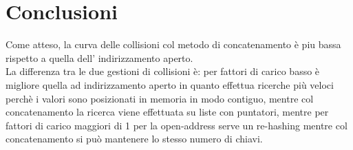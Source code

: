 \documentclass{article}
\begin{document}
\section{Conclusioni}
Come atteso, la curva delle collisioni col metodo di concatenamento è piu bassa rispetto a quella dell' indirizzamento aperto.\\ La differenza tra le due gestioni di collisioni è: per fattori di carico basso è migliore quella ad indirizzamento aperto in quanto effettua ricerche più veloci perchè i valori sono posizionati in memoria in modo contiguo, mentre col concatenamento la ricerca viene effettuata su liste con puntatori, mentre per fattori di carico maggiori di 1 per la open-address serve un re-hashing mentre col concatenamento si può mantenere lo stesso numero di chiavi.
\end{document}
